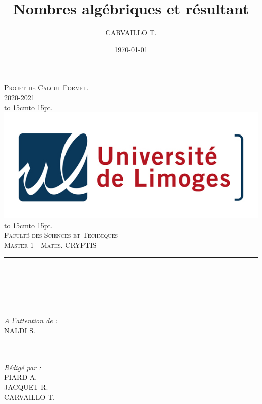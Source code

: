 \documentclass[12pt]{article}
\title{Nombres algébriques et résultant}
\author{CARVAILLO T.}
\date{\today}
\makeatletter
\let\thetitle\@title
\def\dotfill#1{\cleaders\hbox to #1{.}\hfill}
\newcommand\dotline[2][.5em]{\leavevmode\hbox to #2{\dotfill{#1}\hfil}}
\theoremstyle{definition}\newtheorem{defn}{Définition}
\theoremstyle{definition}\newtheorem{exm}{Exemple}
\theoremstyle{definition}\newtheorem{rem}{Remarque}
\theoremstyle{definition}\newtheorem{algo}{Algorithme}
\theoremstyle{remark}\newtheorem{exo}{Exercice}
\theoremstyle{remark}\newtheorem{nota}{Notation}
\makeatother
\begin{document}

\begin{titlepage}
	\centering
    \vspace*{0.5 cm}
    \textsc{\LARGE Projet de Calcul Formel.\\
    \vspace{12pt}
2020-2021}\\[1.0 cm]
    \dotline[15pt]{15cm}\\
	\includegraphics[scale = 2.2]{logo.png}
	\dotline[15pt]{15cm}\\
	\vspace{1.5cm}
	\textsc{\Large Faculté des Sciences et Techniques}\\
	\textsc{\large Master 1 - Maths. CRYPTIS}\\[1.0 cm]
	\rule{\linewidth}{0.2 mm} \\[0.4 cm]
	{ \huge \bfseries \color{blue} \thetitle}\\
	\rule{\linewidth}{0.2 mm} \\[1.5 cm]
	
	\begin{minipage}{0.4\textwidth}
		\begin{flushleft} \large
			\emph{A l'attention de :}\\
			NALDI S.\\
			\phantom{a}\\
			\phantom{a}\\
		\end{flushleft}
	\end{minipage}
	\begin{minipage}{0.5\textwidth}
    	\begin{flushright} \large
		\emph{Rédigé par :}\\
		PIARD A.\\
		JACQUET R.\\
		CARVAILLO T.\\
		\end{flushright}
	\end{minipage}\\[2 cm]
\end{titlepage}
\end{document}
